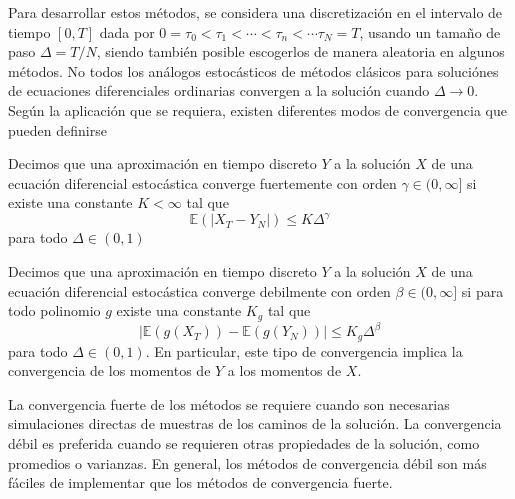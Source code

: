 \documentclass{article}
\begin{document}
\noindent
Para desarrollar estos métodos, se considera una discretización en el intervalo de tiempo $[0,T]$ dada por $0=\tau_0<\tau_1<\cdots<\tau_n<\cdots \tau_N=T$, usando un tamaño de paso $\Delta=T/N$, siendo también posible escogerlos de manera aleatoria en algunos métodos. No todos los análogos estocásticos de métodos clásicos para soluciónes de ecuaciones diferenciales ordinarias convergen a la solución cuando $\Delta \to 0$.\\

\noindent
Según la aplicación que se requiera, existen diferentes modos de convergencia que pueden definirse 
\theoremstyle{definition}
\begin{definition}
Decimos que una aproximación en tiempo discreto $Y$ a la solución $X$ de una ecuación diferencial estocástica converge fuertemente con orden $\gamma\in(0,\infty]$ si existe una constante $K<\infty$ tal que 
\begin{equation}
    \mathbb{E}(|X_T-Y_N|)\leq K\Delta^{\gamma}
\end{equation}
para todo $\Delta\in(0,1)$
\end{definition}

\begin{definition}
Decimos que una aproximación en tiempo discreto $Y$ a la solución $X$ de una ecuación diferencial estocástica converge debilmente con orden $\beta\in(0,\infty]$ si para todo polinomio $g$ existe una constante $K_g$
 tal que 
 \begin{equation}
    |\mathbb{E}(g(X_T))-\mathbb{E}(g(Y_N))|\leq K_g \Delta^{\beta}
\end{equation}
para todo $\Delta\in(0,1)$. En particular, este tipo de convergencia implica la convergencia de los momentos de $Y$ a los momentos de $X$.
\end{definition}

\noindent
La convergencia fuerte de los métodos se requiere cuando son necesarias simulaciones directas de muestras de los caminos de la solución. La convergencia débil es preferida cuando se requieren otras propiedades de la solución, como promedios o varianzas. En general, los métodos de convergencia débil son más fáciles de implementar que los métodos de convergencia fuerte.\\
\end{document}
